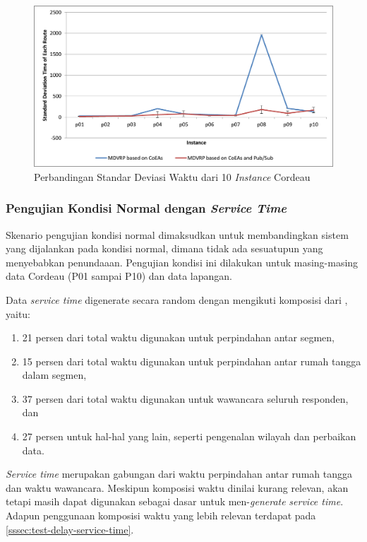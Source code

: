 \begin{figure}[H]
	\centering
	\includegraphics[width=\textwidth]{Resources/Images/test_result_10_cordeau_standard_deviation}
	\caption{Perbandingan Standar Deviasi Waktu dari 10 \textit{Instance} Cordeau}
	\label{fig:test_result_10_cordeau_standard_deviation}
\end{figure}


\subsubsection{Pengujian Kondisi Normal dengan \textit{Service Time}}
\label{ssec:test-normal-service-time}
Skenario pengujian kondisi normal dimaksudkan untuk membandingkan sistem yang dijalankan pada kondisi normal, dimana tidak ada sesuatupun yang menyebabkan penundaaan. Pengujian kondisi ini dilakukan untuk masing-masing data Cordeau (P01 sampai P10) dan data lapangan. 


Data \textit{service time} digenerate secara random dengan mengikuti komposisi dari \citep{sudman_time_1965}, yaitu:
\begin{enumerate}
	\item 21 persen dari total waktu digunakan untuk perpindahan antar segmen, 
	\item 15 persen dari total waktu digunakan untuk perpindahan antar rumah tangga dalam segmen, 
	\item 37 persen dari total waktu digunakan untuk wawancara seluruh responden, dan 
	\item 27 persen untuk hal-hal yang lain, seperti pengenalan wilayah dan perbaikan data.
\end{enumerate}
\textit{Service time} merupakan gabungan dari waktu perpindahan antar rumah tangga dan waktu wawancara. Meskipun komposisi waktu \citep{sudman_time_1965} dinilai kurang relevan, akan tetapi masih dapat digunakan sebagai dasar untuk men-\textit{generate} \textit{service time}. Adapun penggunaan komposisi waktu yang lebih relevan terdapat pada \autoref{sssec:test-delay-service-time}.


